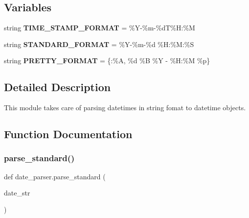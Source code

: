 \subsection*{Variables}
\begin{DoxyCompactItemize}
\item 
\mbox{\label{namespacedate__parser_a9c6653beea157b562a0225872d24c7d0}} 
string {\bfseries T\+I\+M\+E\+\_\+\+S\+T\+A\+M\+P\+\_\+\+F\+O\+R\+M\+AT} = \textquotesingle{}\%Y-\/\%m-\/\%dT\%H\+:\%M\textquotesingle{}
\item 
\mbox{\label{namespacedate__parser_aa7f21d65275bcab56f1612f84812a21e}} 
string {\bfseries S\+T\+A\+N\+D\+A\+R\+D\+\_\+\+F\+O\+R\+M\+AT} = \textquotesingle{}\%Y-\/\%m-\/\%d \%H\+:\%M\+:\%S\textquotesingle{}
\item 
\mbox{\label{namespacedate__parser_a4c7b6acfb4735d035fb751653fc76221}} 
string {\bfseries P\+R\+E\+T\+T\+Y\+\_\+\+F\+O\+R\+M\+AT} = \textquotesingle{}\{\+:\%A, \%d \%B \%Y -\/ \%H\+:\%M \%p\}\textquotesingle{}
\end{DoxyCompactItemize}


\subsection{Detailed Description}
This module takes care of parsing datetimes in string fomat to datetime objects. 

\subsection{Function Documentation}
\mbox{\label{namespacedate__parser_ae84059d175f6c4899d13c0a80de6e054}} 
\subsubsection{\texorpdfstring{parse\+\_\+standard()}{parse\_standard()}}
{\footnotesize\ttfamily def date\+\_\+parser.\+parse\+\_\+standard (\begin{DoxyParamCaption}\item[{}]{date\+\_\+str }\end{DoxyParamCaption})}



